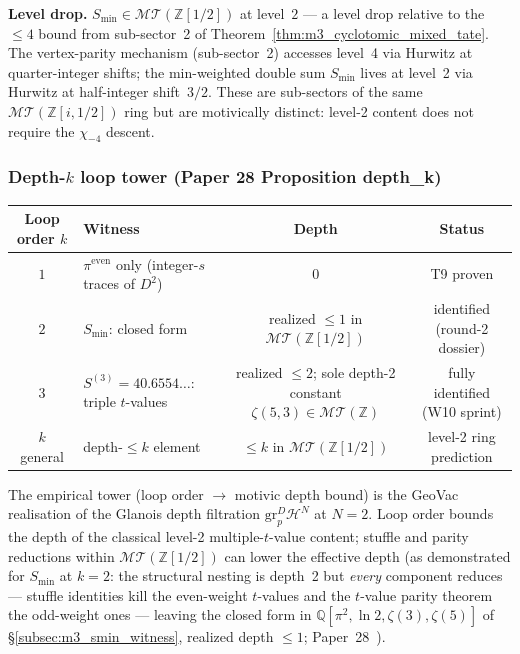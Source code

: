 \documentclass[11pt,a4paper]{article}
\theoremstyle{plain}
\theoremstyle{definition}
\newcommand{\Z}{\mathbb{Z}}
\newcommand{\Q}{\mathbb{Q}}
\newcommand{\MT}{\mathcal{MT}}
\newcommand{\Hcal}{\mathcal{H}}
\begin{document}
\textbf{Level drop.}  $S_{\min} \in \MT(\Z[1/2])$ at level~$2$ ---
a level drop relative to the $\le 4$ bound from sub-sector~2 of
Theorem~\ref{thm:m3_cyclotomic_mixed_tate}.  The vertex-parity
mechanism (sub-sector~2) accesses level~4 via Hurwitz at
quarter-integer shifts; the min-weighted double sum $S_{\min}$ lives
at level~2 via Hurwitz at half-integer shift~$3/2$.  These are
sub-sectors of the same $\MT(\Z[i,1/2])$ ring but are motivically
distinct: level-2 content does not require the $\chi_{-4}$ descent.

\subsubsection{Depth-$k$ loop tower (Paper 28 Proposition depth\_k)}
\label{subsec:m3_depth_k_witness}

\begin{center}
\renewcommand{\arraystretch}{1.15}
\begin{tabular}{@{}clcc@{}}
\toprule
Loop order $k$ & Witness & Depth & Status \\
\midrule
$1$ & $\pi^{\mathrm{even}}$ only (integer-$s$ traces of $D^2$) & $0$ & T9 proven \\
$2$ & $S_{\min}$: closed form & realized $\le 1$ in $\MT(\Z[1/2])$ & identified (round-2 dossier) \\
$3$ & $S^{(3)} = 40.6554\ldots$: triple $t$-values & realized $\le 2$; sole depth-2 constant $\zeta(5,3) \in \MT(\Z)$ & fully identified (W10 sprint) \\
$k$ general & depth-$\le k$ element & $\le k$ in $\MT(\Z[1/2])$ & level-2 ring prediction \\
\bottomrule
\end{tabular}
\end{center}

The empirical tower (loop order $\to$ motivic depth bound) is
the GeoVac realisation of the Glanois depth filtration
$\mathrm{gr}_p^D \Hcal^N$ at $N = 2$.  Loop order bounds the depth of
the classical level-2 multiple-$t$-value content; stuffle and parity
reductions within $\MT(\Z[1/2])$ can lower the effective depth
(as demonstrated for $S_{\min}$ at $k=2$: the structural nesting is
depth~2 but \emph{every} component reduces --- stuffle identities kill
the even-weight $t$-values and the $t$-value parity theorem the
odd-weight ones --- leaving the closed form in
$\Q[\pi^2, \ln 2, \zeta(3), \zeta(5)]$ of
\S\ref{subsec:m3_smin_witness}, realized depth $\le 1$;
Paper~28~\cite{loutey_paper28}).
\end{document}
